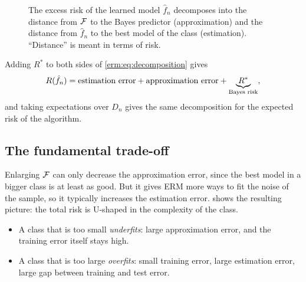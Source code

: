 \begin{notechapter}
\begin{figure}[ht]
\centering
{}
\caption{The excess risk of the learned model $\hat f_n$ decomposes into the
distance from $\mathcal{F}$ to the Bayes predictor (approximation) and the distance from
$\hat f_n$ to the best model of the class (estimation). ``Distance'' is meant
in terms of risk.}
\label{erm:fig:decomposition}
\end{figure}

Adding $R^*$ to both sides of \eqref{erm:eq:decomposition} gives
\[
  R(\hat f_n) = \text{estimation error} + \text{approximation error} + \underbrace{R^*}_{\text{Bayes risk}},
\]
and taking expectations over $D_n$ gives the same decomposition for the
expected risk of the algorithm.

\subsection{The fundamental trade-off}

Enlarging $\mathcal{F}$ can only decrease the approximation error, since the best model
in a bigger class is at least as good. But it gives ERM more ways to fit the
noise of the sample, so it typically increases the estimation error.
 shows the resulting picture: the total risk is
U-shaped in the complexity of the class.
\begin{itemize}
  \item A class that is too small \emph{underfits}: large approximation error,
        and the training error itself stays high.
  \item A class that is too large \emph{overfits}: small training error, large
        estimation error, large gap between training and test error.
\end{itemize}


\end{notechapter}
